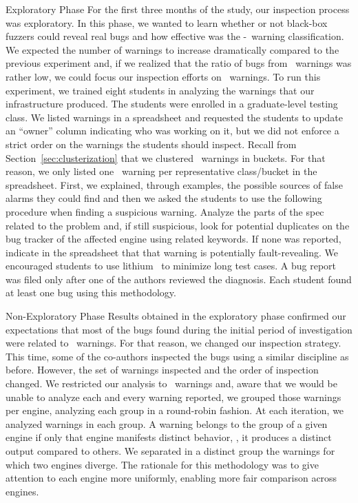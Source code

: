 \documentclass[smallextended]{svjour3}
\begin{document}
\vspace{0.5ex} \lbrack{}Exploratory Phase\rbrack{} For the first
three months of the study, our inspection process was exploratory.  In
this phase, we wanted to learn whether or not black-box fuzzers could
reveal real bugs and how effective was the \hi{}-\lo\ warning
classification.  We expected the number of warnings to increase
dramatically compared to the previous experiment and, if we realized
that the ratio of bugs from \lo\ warnings was rather low, we could
focus our inspection efforts on \hi\ warnings. To run this experiment,
we trained eight students in analyzing the warnings that our
infrastructure produced. The students were enrolled in a
graduate-level testing class. We listed warnings in a spreadsheet and
requested the students to update an ``owner'' column indicating who
was working on it, but we did not enforce a strict order on the
warnings the students should inspect. Recall from
Section~\ref{sec:clusterization} that we clustered \lo\ warnings in
buckets. For that reason, we only listed one \lo\ warning per
representative class/bucket in the spreadsheet. First, we explained,
through examples, the possible sources of false alarms they could find
and then we asked the students to use the following procedure when
finding a suspicious warning. Analyze the parts of the spec related to
the problem and, if still suspicious, look for potential duplicates on
the bug tracker of the affected engine using related keywords. If none
was reported, indicate in the spreadsheet that that warning is
potentially fault-revealing. We encouraged students to use
lithium~\cite{lithium} to minimize long test cases. A bug report
was filed only after one of the authors reviewed the diagnosis. Each
student found at least one bug using this methodology.

\vspace{0.5ex} \lbrack{}Non-Exploratory Phase\rbrack{} Results
obtained in the exploratory phase confirmed our expectations that most
of the bugs found during the initial period of investigation were
related to \hi\ warnings. For that reason, we changed our inspection
strategy. This time, some of the co-authors inspected the bugs using a
similar discipline as before. However, the set of warnings inspected
and the order of inspection changed. We restricted our analysis to
\hi\ warnings and, aware that we would be unable to analyze each and
every warning reported, we grouped those warnings per engine,
analyzing each group in a round-robin fashion.  At each iteration, we
analyzed \warningsIteration{} warnings in each group. A warning
belongs to the group of a given engine if only that engine manifests
distinct behavior, \ie{}, it produces a distinct output compared to
others. We separated in a distinct group the warnings for which two
engines diverge. The rationale for this methodology was to give
attention to each engine more uniformly, enabling more fair comparison
across engines.
\end{document}
